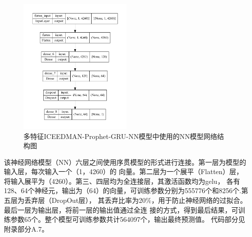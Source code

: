 \documentclass[AutoFakeBold]{LZUThesis}
\begin{document}
\begin{figure}[H]
	\centering
    \includegraphics[width=0.5\textwidth]{figures/all_feature_prophet_gru_nnmodel_plot.pdf}
    \caption{多特征ICEEDMAN-Prophet-GRU-NN模型中使用的NN模型网络结构图}
    \label{fig_gru_nn}
\end{figure}

该神经网络模型（NN）六层之间使用序贯模型的形式进行连接。第一层为模型的输入层，每次输入一个（1，4260）的
向量。第二层为一个展平（Flatten）层，将输入展平为（4260）。第三、四层均为全连接层，其激活函数均为gelu，
各有128、64个神经元，输出为（64）的向量，可训练参数分别为555776个和8256个.第五层为丢弃层（DropOut层），
其丢弃比率为20\%，用于防止神经网络的过拟合。最后一层为输出层，将前一层的输出值通过全连
接的方式，得到最后结果，可训练参数65个。整个模型可训练参数共计564097个，输出最终预测值。
代码部分见附录部分A.7。
\end{document}
